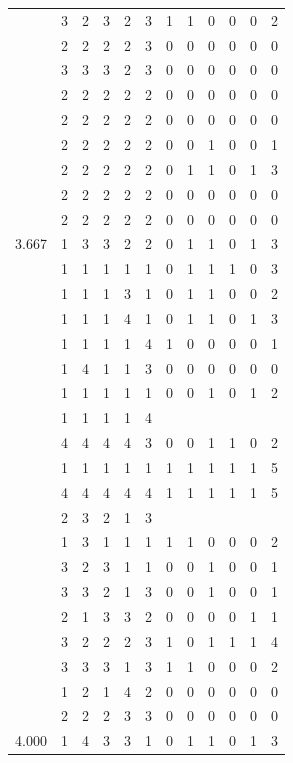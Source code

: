 \documentclass[]{book}
\theoremstyle{definition}
\theoremstyle{definition}
\theoremstyle{definition}
\theoremstyle{remark}
\begin{document}
\begin{table}
{\begin{tabular}[t]{rrrrrrrrrrrr}
 & 3 & 2 & 3 & 2 & 3 & 1 & 1 & 0 & 0 & 0 & 2\\
 & 2 & 2 & 2 & 2 & 3 & 0 & 0 & 0 & 0 & 0 & 0\\
 & 3 & 3 & 3 & 2 & 3 & 0 & 0 & 0 & 0 & 0 & 0\\
 & 2 & 2 & 2 & 2 & 2 & 0 & 0 & 0 & 0 & 0 & 0\\
 & 2 & 2 & 2 & 2 & 2 & 0 & 0 & 0 & 0 & 0 & 0\\
 & 2 & 2 & 2 & 2 & 2 & 0 & 0 & 1 & 0 & 0 & 1\\
 & 2 & 2 & 2 & 2 & 2 & 0 & 1 & 1 & 0 & 1 & 3\\
 & 2 & 2 & 2 & 2 & 2 & 0 & 0 & 0 & 0 & 0 & 0\\
 & 2 & 2 & 2 & 2 & 2 & 0 & 0 & 0 & 0 & 0 & 0\\
3.667 & 1 & 3 & 3 & 2 & 2 & 0 & 1 & 1 & 0 & 1 & 3\\
 & 1 & 1 & 1 & 1 & 1 & 0 & 1 & 1 & 1 & 0 & 3\\
 & 1 & 1 & 1 & 3 & 1 & 0 & 1 & 1 & 0 & 0 & 2\\
 & 1 & 1 & 1 & 4 & 1 & 0 & 1 & 1 & 0 & 1 & 3\\
 & 1 & 1 & 1 & 1 & 4 & 1 & 0 & 0 & 0 & 0 & 1\\
 & 1 & 4 & 1 & 1 & 3 & 0 & 0 & 0 & 0 & 0 & 0\\
 & 1 & 1 & 1 & 1 & 1 & 0 & 0 & 1 & 0 & 1 & 2\\
 & 1 & 1 & 1 & 1 & 4 &  &  &  &  &  & \\
 & 4 & 4 & 4 & 4 & 3 & 0 & 0 & 1 & 1 & 0 & 2\\
 & 1 & 1 & 1 & 1 & 1 & 1 & 1 & 1 & 1 & 1 & 5\\
 & 4 & 4 & 4 & 4 & 4 & 1 & 1 & 1 & 1 & 1 & 5\\
 & 2 & 3 & 2 & 1 & 3 &  &  &  &  &  & \\
 & 1 & 3 & 1 & 1 & 1 & 1 & 1 & 0 & 0 & 0 & 2\\
 & 3 & 2 & 3 & 1 & 1 & 0 & 0 & 1 & 0 & 0 & 1\\
 & 3 & 3 & 2 & 1 & 3 & 0 & 0 & 1 & 0 & 0 & 1\\
 & 2 & 1 & 3 & 3 & 2 & 0 & 0 & 0 & 0 & 1 & 1\\
 & 3 & 2 & 2 & 2 & 3 & 1 & 0 & 1 & 1 & 1 & 4\\
 & 3 & 3 & 3 & 1 & 3 & 1 & 1 & 0 & 0 & 0 & 2\\
 & 1 & 2 & 1 & 4 & 2 & 0 & 0 & 0 & 0 & 0 & 0\\
 & 2 & 2 & 2 & 3 & 3 & 0 & 0 & 0 & 0 & 0 & 0\\
4.000 & 1 & 4 & 3 & 3 & 1 & 0 & 1 & 1 & 0 & 1 & 3\\

\end{tabular}}
\end{table}
\end{document}
